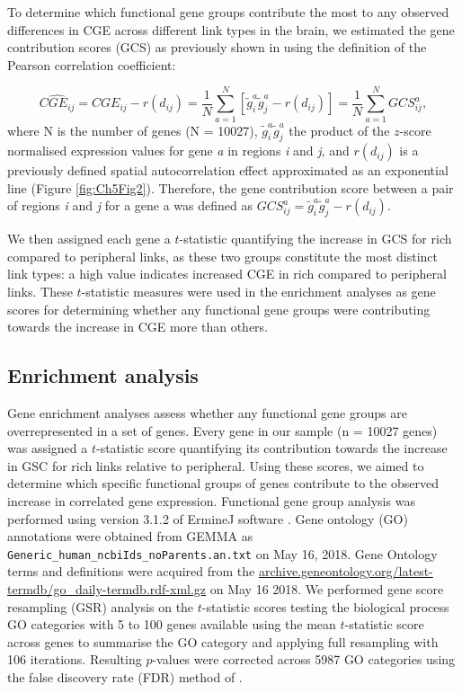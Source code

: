 To determine which functional gene groups contribute the most to any observed differences in CGE across different link types in the brain, we estimated the gene contribution scores (GCS) as previously shown in \citep{Fulcher2016} using the definition of the Pearson correlation coefficient:

\begin{equation}
    \label{eqn:Ch5Eq5}
    \widehat{CGE_{ij}} = CGE_{ij} - r(d_{ij}) = \frac{1}{N}\sum_{a=1}^{N}[\widetilde{g}_{i}^{a}\widetilde{g}_{j}^{a} - r(d_{ij})] = \frac{1}{N}\sum_{a=1}^{N}GCS_{ij}^{a},
\end{equation}
where N is the number of genes (N = \num{10 027}), $\widetilde{g}_{i}^{a} \widetilde{g}_{j}^{a}$ the product of the $z$-score normalised expression values for gene \textit{a} in regions \textit{i} and \textit{j}, and $r(d_{ij})$ is a previously defined spatial autocorrelation effect approximated as an exponential line (Figure \ref{fig:Ch5Fig2}). Therefore, the gene contribution score between a pair of regions \textit{i} and \textit{j} for a gene a was defined as $GCS_{ij}^{a}= \widetilde{g}_{i}^{a}\widetilde{g}_{j}^{a} - r(d_{ij})$.

We then assigned each gene a $t$-statistic quantifying the increase in GCS for rich compared to peripheral links, as these two groups constitute the most distinct link types: a high value indicates increased CGE in rich compared to peripheral links. These $t$-statistic measures were used in the enrichment analyses as gene scores for determining whether any functional gene groups were contributing towards the increase in CGE more than others.

\subsection{Enrichment analysis}
\label{sec:enrichment}
Gene enrichment analyses assess whether any functional gene groups are overrepresented in a set of genes. Every gene in our sample (n = \num{10027} genes) was assigned a $t$-statistic score quantifying its contribution towards the increase in GSC for rich links relative to peripheral. Using these scores, we aimed to determine which specific functional groups of genes contribute to the observed increase in correlated gene expression. Functional gene group analysis was performed using version 3.1.2 of ErmineJ software \citep{Gillis2010}. Gene ontology (GO) \citep{Ashburner2000} annotations were obtained from GEMMA \citep{Zoubarev2012} as \texttt{Generic\_human\_ncbiIds\_noParents.an.txt} on May 16, 2018. Gene Ontology terms and definitions were acquired from the \url{archive.geneontology.org/latest-termdb/go_daily-termdb.rdf-xml.gz} on May 16 2018. We performed gene score resampling (GSR) analysis on the $t$-statistic scores testing the biological process GO categories with 5 to 100 genes available using the mean $t$-statistic score across genes to summarise the GO category and applying full resampling with 106 iterations. Resulting $p$-values were corrected across \num{5987} GO categories using the false discovery rate (FDR) method of \citet{Benjamini1995}.

